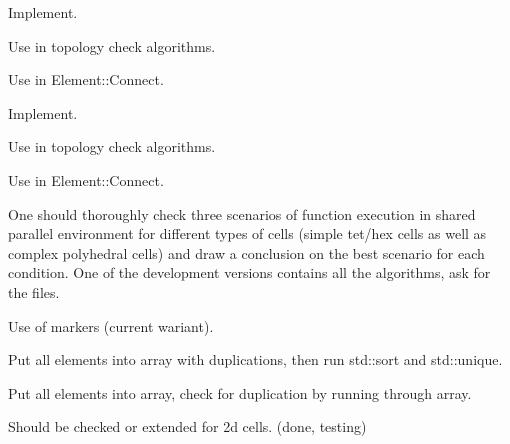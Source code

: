 
\begin{DoxyRefList}
\item[\label{todo__todo000003}%
\hypertarget{todo__todo000003}{}%
Member \hyperlink{classINMOST_1_1Cell_afc84112c4d1f84b15799ffb91615cd30}{I\-N\-M\-O\-S\-T\-:\-:Cell\-:\-:Check\-Edge\-Order} () const ]
\begin{DoxyEnumerate}
\item Implement.
\item Use in topology check algorithms.
\item Use in Element\-::\-Connect.  
\end{DoxyEnumerate}
\item[\label{todo__todo000004}%
\hypertarget{todo__todo000004}{}%
Member \hyperlink{classINMOST_1_1Cell_a84eaa268f8c3886e1164ea14715f2419}{I\-N\-M\-O\-S\-T\-:\-:Cell\-:\-:Fix\-Edge\-Order} () const ]
\begin{DoxyEnumerate}
\item Implement.
\item Use in topology check algorithms.
\item Use in Element\-::\-Connect.  
\end{DoxyEnumerate}
\item[\label{todo__todo000002}%
\hypertarget{todo__todo000002}{}%
Member \hyperlink{classINMOST_1_1Cell_ab0f9c4743826338a4df1b61b69b37c40}{I\-N\-M\-O\-S\-T\-:\-:Cell\-:\-:get\-Edges} () const ]One should thoroughly check three scenarios of function execution in shared parallel environment for different types of cells (simple tet/hex cells as well as complex polyhedral cells) and draw a conclusion on the best scenario for each condition. One of the development versions contains all the algorithms, ask for the files.
\begin{DoxyEnumerate}
\item Use of markers (current wariant).
\item Put all elements into array with duplications, then run std\-::sort and std\-::unique.
\item Put all elements into array, check for duplication by running through array. 
\end{DoxyEnumerate}
\item[\label{todo__todo000006}%
\hypertarget{todo__todo000006}{}%
Member \hyperlink{classINMOST_1_1Cell_a91562ae41d48c2fb99b824b7407659f5}{I\-N\-M\-O\-S\-T\-:\-:Cell\-:\-:Inside} (const real $\ast$point) const ]
\begin{DoxyEnumerate}
\item Should be checked or extended for 2d cells. (done, testing)  

\end{DoxyEnumerate}
\end{DoxyRefList}
